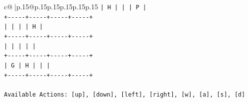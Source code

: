\documentclass{article}
\begin{document}
{\begin{supertabular}{c@{$\;$}|p{.15\linewidth}@{}p{.15\linewidth}p{.15\linewidth}p{.15\linewidth}p{.15\linewidth}p{.15\linewidth}}
{{{\texttt{|  H  |     |     |  P  |} \\
\texttt{+{-}{-}{-}{-}{-}+{-}{-}{-}{-}{-}+{-}{-}{-}{-}{-}+{-}{-}{-}{-}{-}+} \\
\texttt{|     |     |     |  H  |} \\
\texttt{+{-}{-}{-}{-}{-}+{-}{-}{-}{-}{-}+{-}{-}{-}{-}{-}+{-}{-}{-}{-}{-}+} \\
\texttt{|     |     |     |     |} \\
\texttt{+{-}{-}{-}{-}{-}+{-}{-}{-}{-}{-}+{-}{-}{-}{-}{-}+{-}{-}{-}{-}{-}+} \\
\texttt{|  G  |  H  |     |     |} \\
\texttt{+{-}{-}{-}{-}{-}+{-}{-}{-}{-}{-}+{-}{-}{-}{-}{-}+{-}{-}{-}{-}{-}+} \\
\\ 
\texttt{Available Actions: {[}up{]}, {[}down{]}, {[}left{]}, {[}right{]}, {[}w{]}, {[}a{]}, {[}s{]}, {[}d{]}} \\
            }
        }
    }
     \\ \\


\end{supertabular}}
\end{document}
